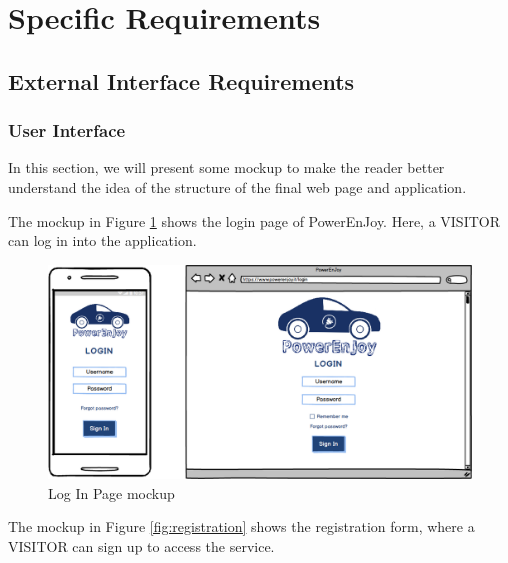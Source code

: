 \section{Specific Requirements} \label{sec:spec_requirements}


\subsection{External Interface Requirements} \label{external}

\subsubsection{User Interface} \label{user_interface}

In this section, we will present some mockup to make the reader better understand the idea of the structure of the final web page and application.

\newline
The mockup in Figure \ref{fig:login} shows the login page of PowerEnJoy. Here, a VISITOR can log in into the application.

\vspace{70pt}

\begin{figure}[htbp]
\centering
\includegraphics[width=\textwidth]{Images/Mockups/Login}
\caption{Log In Page mockup}
\label{fig:login}
\end{figure}
\clearpage

\newline
The mockup in Figure \ref{fig:registration} shows the registration form, where a VISITOR can sign up to access the service.

